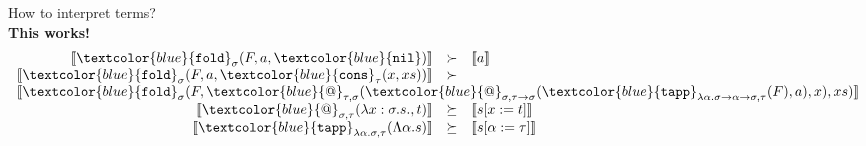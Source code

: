 \documentclass[10pt,presentation,color=names]{beamer}
\newcommand{\arrtype}{\rightarrow}
\newcommand{\abs}[2]{\lambda #1.#2}
\newcommand{\tabs}[2]{\Lambda #1.#2}
\newcommand{\interpret}[1]{\llbracket #1 \rrbracket}
\newcommand{\symb}[1]{\textcolor{blue}{\mathtt{#1}}}
\newcommand{\nil}{\symb{nil}}
\newcommand{\cons}{\symb{cons}}
\newcommand{\fold}{\symb{fold}}
\begin{document}
\begin{frame}{How to interpret terms?}
\ \\\pause\textbf{This works!}
\[
\begin{array}{rcll}
\interpret{\fold_{\sigma}(F,a,\nil)} & \succ & \interpret{a} \\
\interpret{\fold_{\sigma}(F,a,\cons_{\tau}(x,xs))} & \succ \\
  \multicolumn{4}{r}{\interpret{
    \fold_{\sigma}(F,\symb{@}_{\tau,\sigma}(\symb{@}_{\sigma,\tau \arrtype \sigma}(\symb{tapp}_{\lambda \alpha.\sigma \arrtype \alpha \arrtype \sigma,\tau}(F), a), x),xs)
  }} \\
\interpret{\symb{@}_{\sigma,\tau}(\abs{x:\sigma.s},t)} & \succeq & \interpret{s[x:=t]} \\
\interpret{\symb{tapp}_{\lambda \alpha.\sigma,\tau}(\tabs{\alpha}{s})} & \succeq & \interpret{s[\alpha:=\tau]} \\
\end{array}
\]
\end{frame}
\end{document}
